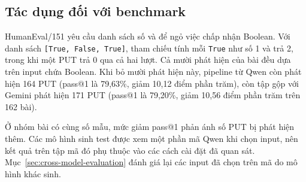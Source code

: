 \subsection{Tác dụng đối với benchmark}

HumanEval/151 yêu cầu danh sách số và để ngỏ việc chấp nhận Boolean. Với danh sách \texttt{[True, False, True]}, tham chiếu tính mỗi \texttt{True} như số 1 và trả 2, trong khi một PUT trả 0 qua cả hai lượt. Cả mười phát hiện của bài đều dựa trên input chứa Boolean. Khi bỏ mười phát hiện này, pipeline từ Qwen còn phát hiện 164 PUT (pass@1 là 79,63\%, giảm 10,12 điểm phần trăm), còn tập gộp với Gemini phát hiện 171 PUT (pass@1 là 79,20\%, giảm 10,56 điểm phần trăm trên 162 bài).

Ở nhóm bài có cùng số mẫu, mức giảm pass@1 phản ánh số PUT bị phát hiện thêm. Các mô hình sinh test được xem một phần mã Qwen khi chọn input, nên kết quả trên tập mã đó phụ thuộc vào các cách cài đặt đã quan sát. Mục~\ref{sec:cross-model-evaluation} đánh giá lại các input đã chọn trên mã do mô hình khác sinh.
